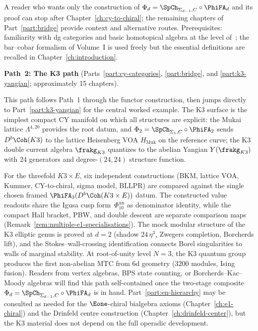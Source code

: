 A reader who wants only the construction of
$\Phi_d = \SpCh_{\Sigma_{d-1}, C}\circ\PhiFA_d$ and its
proof can stop after Chapter~\ref{ch:cy-to-chiral}; the
remaining chapters of Part~\ref{part:bridge} provide context
and alternative routes. Prerequisites: familiarity with dg
categories and basic homotopical algebra at the level
of~\cite{LurieHA}; the bar--cobar formalism of Volume~I is
used freely but the essential definitions are recalled in
Chapter~\ref{ch:introduction}.

\medskip

\noindent\textbf{Path~2: The K3 path}
(Parts~\ref{part:cy-categories}, \ref{part:bridge}, and
\ref{part:k3-yangian}; approximately 15 chapters).

\smallskip

\noindent
This path follows Path~1 through the functor construction,
then jumps directly to Part~\ref{part:k3-yangian} for the
central worked example. The K3 surface is the simplest
compact CY manifold on which all structures are explicit: the
Mukai lattice $\Lambda^{4,20}$ provides the root datum, and
$\Phi_2 = \SpCh_{\Sigma_1, C}\circ\PhiFA_2$ sends
$D^b\Coh(K3)$ to the lattice Heisenberg VOA $H_{\mathrm{Muk}}$
on the reference curve; the K3 double current algebra
$\frakg_{K3}$ quantizes to the abelian Yangian
$Y(\frakg_{K3})$ with $24$ generators and degree-$(24, 24)$
structure function.

For the threefold $K3 \times E$, six independent constructions
(BKM, lattice VOA, Kummer, CY-to-chiral, sigma model, BLLPR)
are compared against the single chosen framed
$\PhiFA_3(D^b\Coh(K3\times E))$ datum. The constructed value readouts
share the Igusa cusp form~$\Phi_{10}^{\mathrm{un}}$ as denominator
identity, while the compact Hall bracket, PBW, and double descent are
separate comparison maps (Remark~\ref{rem:multiple-e1-specialisations}). The mock modular
structure of the K3 elliptic genus is proved at $d = 2$
(shadow $24\,\eta^3$, Zwegers completion, Borcherds lift), and
the Stokes--wall-crossing identification connects Borel
singularities to walls of marginal stability. At
root-of-unity level $N = 3$, the K3 quantum group produces
the first non-abelian MTC from 6d geometry ($3200$ modules,
Ising fusion). Readers from vertex algebras, BPS state
counting, or Borcherds--Kac--Moody algebras will find this
path self-contained once the two-stage composite
$\Phi_d = \SpCh_{\Sigma_{d-1}, C}\circ\PhiFA_d$ is in hand.
Part~\ref{part:en-hierarchy} may be consulted as needed for
the $\Eone$-chiral bialgebra axioms
(Chapter~\ref{ch:e1-chiral}) and the Drinfeld centre
construction (Chapter~\ref{ch:drinfeld-center}), but the K3
material does not depend on the full operadic development.

